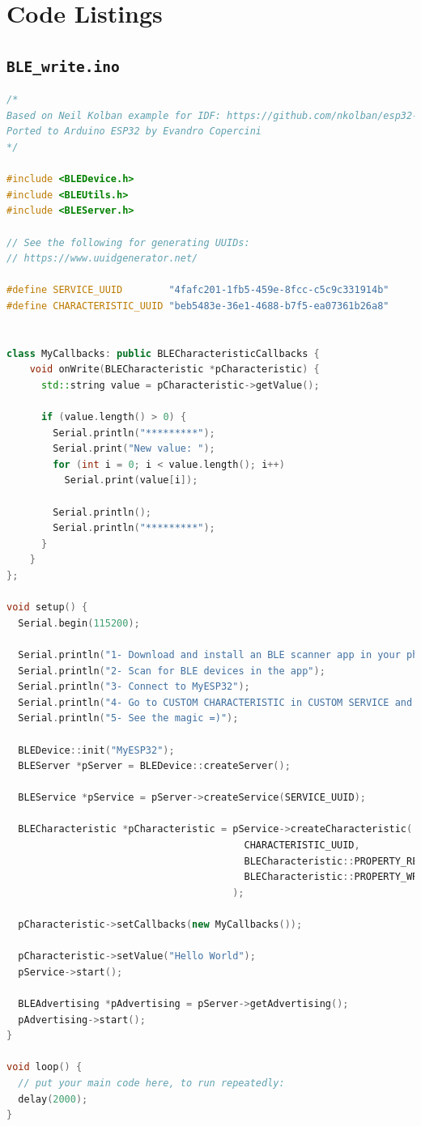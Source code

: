 \documentclass[12pt,openany,a4paper]{book}
\begin{document}
\chapter{Code Listings}

\section{\texttt{BLE\_write.ino}}
\label{code:ble_write}
\begin{lstlisting}[basicstyle=\ttfamily,breaklines=true,language=c++]
/*
Based on Neil Kolban example for IDF: https://github.com/nkolban/esp32-snippets/blob/master/cpp_utils/tests/BLE%20Tests/SampleWrite.cpp
Ported to Arduino ESP32 by Evandro Copercini
*/

#include <BLEDevice.h>
#include <BLEUtils.h>
#include <BLEServer.h>

// See the following for generating UUIDs:
// https://www.uuidgenerator.net/

#define SERVICE_UUID        "4fafc201-1fb5-459e-8fcc-c5c9c331914b"
#define CHARACTERISTIC_UUID "beb5483e-36e1-4688-b7f5-ea07361b26a8"


class MyCallbacks: public BLECharacteristicCallbacks {
    void onWrite(BLECharacteristic *pCharacteristic) {
      std::string value = pCharacteristic->getValue();

      if (value.length() > 0) {
        Serial.println("*********");
        Serial.print("New value: ");
        for (int i = 0; i < value.length(); i++)
          Serial.print(value[i]);

        Serial.println();
        Serial.println("*********");
      }
    }
};

void setup() {
  Serial.begin(115200);

  Serial.println("1- Download and install an BLE scanner app in your phone");
  Serial.println("2- Scan for BLE devices in the app");
  Serial.println("3- Connect to MyESP32");
  Serial.println("4- Go to CUSTOM CHARACTERISTIC in CUSTOM SERVICE and write something");
  Serial.println("5- See the magic =)");

  BLEDevice::init("MyESP32");
  BLEServer *pServer = BLEDevice::createServer();

  BLEService *pService = pServer->createService(SERVICE_UUID);

  BLECharacteristic *pCharacteristic = pService->createCharacteristic(
                                         CHARACTERISTIC_UUID,
                                         BLECharacteristic::PROPERTY_READ |
                                         BLECharacteristic::PROPERTY_WRITE
                                       );

  pCharacteristic->setCallbacks(new MyCallbacks());

  pCharacteristic->setValue("Hello World");
  pService->start();

  BLEAdvertising *pAdvertising = pServer->getAdvertising();
  pAdvertising->start();
}

void loop() {
  // put your main code here, to run repeatedly:
  delay(2000);
}
\end{lstlisting}
\end{document}
